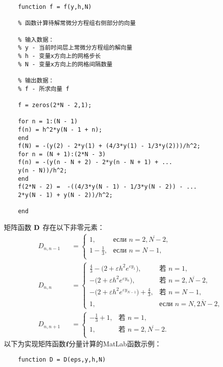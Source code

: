 \documentclass[twoside]{book}
\def\textbf{\bf}%
\begin{document}
\begin{CJK*}{GBK}{song}
	\begin{lstlisting}	
	function f = f(y,h,N)
	
	% 函数计算待解常微分方程组右侧部分的向量
	
	% 输入数据：
	% y - 当前时间层上常微分方程组的解向量
	% h - 变量x方向上的网格步长
	% N - 变量x方向上的网格间隔数量
	
	% 输出数据：
	% f - 所求向量 f
	
	f = zeros(2*N - 2,1);
	
	for n = 1:(N - 1)
	f(n) = h^2*y(N - 1 + n);
	end
	f(N) = -(y(2) - 2*y(1) + (4/3*y(1) - 1/3*y(2)))/h^2;
	for n = (N + 1):(2*N - 3)
	f(n) = -(y(n - N + 2) - 2*y(n - N + 1) + ...
	y(n - N))/h^2;
	end
	f(2*N - 2) =  -((4/3*y(N - 1) - 1/3*y(N - 2)) - ...
	2*y(N - 1) + y(N - 2))/h^2;
	
	end
	\end{lstlisting}


	矩阵函数 $\emph{\textbf{D}}$ 存在以下非零元素：
	\begin{equation*}
	\begin{aligned}
	&D_{n,n-1} & &= \begin{cases}
	1,&\text{если $n = \overline{2,N-2}$,}\\
	1 - \frac{1}{3},&\text{если $n = N - 1$,}\\
	\end{cases}\\
	&D_{n,n} & &= \begin{cases}
	\frac{4}{3} - \big(2 +  \varepsilon h^2 e^{\varepsilon y_1}\big),&\text{若 $n = 1$,}\\
	- \big(2 +  \varepsilon h^2 e^{\varepsilon y_n}\big),&\text{若 $n = \overline{2,N-2}$,}\\
	- \big(2 +  \varepsilon h^2 e^{\varepsilon y_{N - 1}}\big) + \frac{4}{3},&\text{若 $n = N - 1$,}\\
	1,&\text{если $n = \overline{N,2N - 2}$,}
	\end{cases}\\
	&D_{n,n+1} & &= \begin{cases}
	-\frac{1}{3} + 1,&\text{若 $n = 1$,}\\
	1,&\text{若 $n = \overline{2,N-2}$.}\\
	\end{cases}
	\end{aligned}
	\end{equation*}
	以下为实现矩阵函数$\emph{\textbf{f}}$分量计算的MatLab函数示例：

	\begin{lstlisting}
	function D = D(eps,y,h,N)
	

\end{lstlisting}
\end{CJK*}
\end{document}
